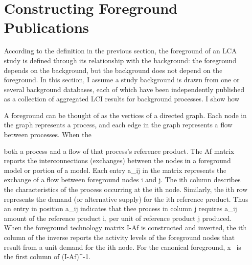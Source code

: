 \section{Constructing Foreground Publications}

According to the definition in the previous section, the foreground of an LCA study is defined through its relationship with the background: the foreground depends on the background, but the background does not depend on the foreground.  In this section, I assume a study background is drawn from one or several background databases, each of which have been independently published as a collection of aggregated LCI results for background processes.  I show how 


A foreground can be thought of as the vertices of a directed graph.  Each node in the graph represents a process, and each edge in the graph represents a flow between processes.  When the


both a process and a flow of that process's reference product.  The Af matrix reports the interconnections (exchanges) between the nodes in a foreground model or portion of a model.  Each entry a_ij in the matrix represents the exchange of a flow between foreground nodes i and j.  The ith column describes the characteristics of the process occurring at the ith node.  Similarly, the ith row represents the demand (or alternative supply) for the ith reference product.  Thus an entry in position a_ij indicates that thee process in column j requires a_ij amount of the reference product i, per unit of reference product j produced.  When the foreground technology matrix I-Af is constructed and inverted, the ith column of the inverse reports the activity levels of the foreground nodes that result from a unit demand for the ith node.  For the canonical foreground, x~ is the first column of (I-Af)^{-1}.
